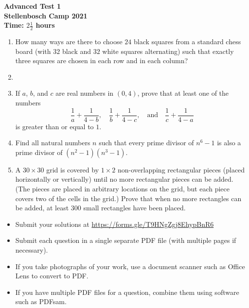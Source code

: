 \documentclass{article}
\begin{document}
\thispagestyle{empty}

\begin{center}
  \textbf{\Large Advanced Test 1}
  \\ \vspace{1em}
  \textbf{\large Stellenbosch Camp 2021}
  \\ \vspace{1em}
  \textbf{\large Time: $2\frac{1}{2}$ hours}
\end{center}

\vspace{24pt}

\begin{enumerate}[1.]

\item %
How many ways are there to choose $24$ black squares from a standard chess board (with $32$ black and $32$ white squares alternating) such that exactly three squares are chosen in each row and in each column?


\item %


\item %
If $a$, $b$, and $c$ are real numbers in $(0,4)$, prove that at least one of the numbers
\[ \frac{1}{a} +\frac{1}{4-b}, \quad \frac{1}{b} +\frac{1}{4-c}, \quad\text{and}\quad \frac{1}{c} +\frac{1}{4-a} \]
is greater than or equal to $1$.


\item %
Find all natural numbers $n$ such that every prime divisor of $n^6 - 1$ is also a prime divisor of $(n^2 - 1)(n^3 - 1)$. 


\item %
A $30 \times 30$ grid is covered by $1 \times 2$ non-overlapping rectangular pieces (placed horizontally or vertically) until no more rectangular pieces can be added. (The pieces are placed in arbitrary locations on the grid, but each piece covers two of the cells in the grid.) Prove that when no more rectangles can be added, at least $300$ small rectangles have been placed.

\end{enumerate}


\vfill
\begin{itemize}
	\item Submit your solutions at \href{https://forms.gle/T9HNgZgj8EhypBnR6}{https://forms.gle/T9HNgZgj8EhypBnR6}
	\item Submit each question in a single separate PDF file (with multiple pages if necessary).
	\item If you take photographs of your work, use a document scanner such as Office Lens to convert to PDF.
	\item If you have multiple PDF files for a question, combine them using software such as PDFsam.
\end{itemize}
\end{document}
